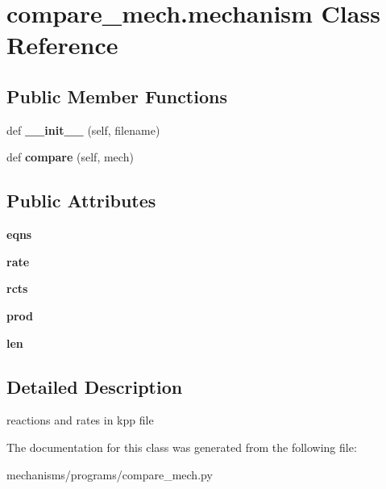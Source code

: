 \hypertarget{classcompare__mech_1_1mechanism}{}\section{compare\+\_\+mech.\+mechanism Class Reference}
\label{classcompare__mech_1_1mechanism}
\subsection*{Public Member Functions}
\begin{DoxyCompactItemize}
\item 
\mbox{\label{classcompare__mech_1_1mechanism_a3cb008a9a9d0b6afcc942d0c702edfee}} 
def {\bfseries \+\_\+\+\_\+init\+\_\+\+\_\+} (self, filename)
\item 
\mbox{\label{classcompare__mech_1_1mechanism_abdc92ea51731c4d4ce1c82e0a1ecf34b}} 
def {\bfseries compare} (self, mech)
\end{DoxyCompactItemize}
\subsection*{Public Attributes}
\begin{DoxyCompactItemize}
\item 
\mbox{\label{classcompare__mech_1_1mechanism_af53a0110fd25235e7aa3d30dbf46604f}} 
{\bfseries eqns}
\item 
\mbox{\label{classcompare__mech_1_1mechanism_ab8e722bb7fea49d8ff6ef8e2e9c6bd5b}} 
{\bfseries rate}
\item 
\mbox{\label{classcompare__mech_1_1mechanism_a50e644b497565c95471a750b3bf731fd}} 
{\bfseries rcts}
\item 
\mbox{\label{classcompare__mech_1_1mechanism_a7d04ab401750ddef2036763e90cc6871}} 
{\bfseries prod}
\item 
\mbox{\label{classcompare__mech_1_1mechanism_a045a5eaac67dd97f0c78faeb3ab32b30}} 
{\bfseries len}
\end{DoxyCompactItemize}


\subsection{Detailed Description}
\begin{DoxyVerb}reactions and rates in kpp file\end{DoxyVerb}
 

The documentation for this class was generated from the following file\+:\begin{DoxyCompactItemize}
\item 
mechanisms/programs/compare\+\_\+mech.\+py\end{DoxyCompactItemize}
